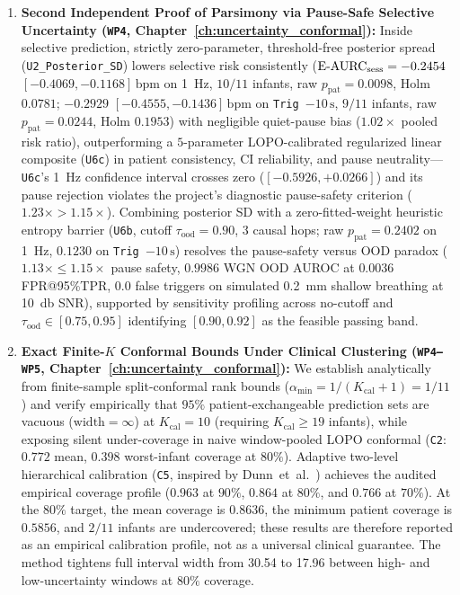 \begin{enumerate}
  \item \textbf{Second Independent Proof of Parsimony via Pause-Safe Selective Uncertainty (\texttt{WP4}, Chapter~\ref{ch:uncertainty_conformal}):}
    Inside selective prediction, strictly zero-parameter, threshold-free posterior spread
    (\texttt{U2\_\allowbreak Posterior\_\allowbreak SD}) lowers selective risk consistently
    ($\mathrm{E\text{-}AURC}_{\mathrm{sess}} = -0.2454$
    $[-0.4069,-0.1168]\,\mathrm{bpm}$ on \SI{1}{\hertz}, $10/11$ infants, raw $p_{\mathrm{pat}} = 0.0098$, Holm
    $0.0781$; $-0.2929$ $[-0.4555,-0.1436]\,\mathrm{bpm}$ on \texttt{Trig~$-10\,\mathrm{s}$}, $9/11$ infants, raw
    $p_{\mathrm{pat}} = 0.0244$, Holm $0.1953$) with negligible quiet-pause bias ($1.02\times$ pooled risk
    ratio), outperforming a $5$-parameter LOPO-calibrated regularized linear composite (\texttt{U6c}) in patient
    consistency, CI reliability, and pause neutrality---\texttt{U6c}'s \SI{1}{\hertz} confidence
    interval crosses zero ($[-0.5926,\allowbreak +0.0266]$) and its pause rejection violates the
    project's diagnostic pause-safety criterion ($1.23\times > 1.15\times$). Combining posterior SD
    with a zero-fitted-weight heuristic entropy barrier (\texttt{U6b}, cutoff $\tau_{\mathrm{ood}}=0.90$,
    $3$ causal hops; raw $p_{\mathrm{pat}}=0.2402$ on \SI{1}{\hertz}, $0.1230$ on
    \texttt{Trig~$-10\,\mathrm{s}$}) resolves the pause-safety versus OOD paradox ($1.13\times \le 1.15\times$
    pause safety, $0.9986$ WGN OOD AUROC at $0.0036$ FPR@95\%TPR, $0.0$ false triggers on simulated
    \SI{0.2}{\milli\meter} shallow breathing at \SI{10}{\decibel} SNR), supported by sensitivity profiling across
    no-cutoff and $\tau_{\mathrm{ood}}\in[0.75,0.95]$ identifying $[0.90,0.92]$ as the feasible passing band.

  \item \textbf{Exact Finite-$K$ Conformal Bounds Under Clinical Clustering (\texttt{WP4--WP5}, Chapter~\ref{ch:uncertainty_conformal}):}
    We establish analytically from finite-sample split-conformal rank bounds ($\alpha_{\min} = 1/(K_{\mathrm{cal}}+1) = 1/11$) and verify empirically
    that $95\%$ patient-exchangeable prediction sets are vacuous ($\mathrm{width}=\infty$) at
    $K_{\mathrm{cal}}=10$ (requiring $K_{\mathrm{cal}}\ge 19$ infants), while exposing silent
    under-coverage in naive window-pooled LOPO conformal (\texttt{C2}: $0.772$ mean, $0.398$ worst-infant
    coverage at $80\%$). Adaptive two-level hierarchical calibration (\texttt{C5}, inspired by
    Dunn~et~al.\ \citep{dunn2023distribution}) achieves the audited empirical coverage profile
    ($0.963$ at $90\%$, $0.864$ at $80\%$, and $0.766$ at $70\%$). At the $80\%$ target, the
    mean coverage is $0.8636$, the minimum patient coverage is $0.5856$, and $2/11$ infants are
    undercovered; these results are therefore reported as an empirical calibration profile, not as
    a universal clinical guarantee. The method tightens full interval width from \SI{30.54}{\bpm} to
    \SI{17.96}{\bpm} between high- and low-uncertainty windows at $80\%$ coverage.


\end{enumerate}
